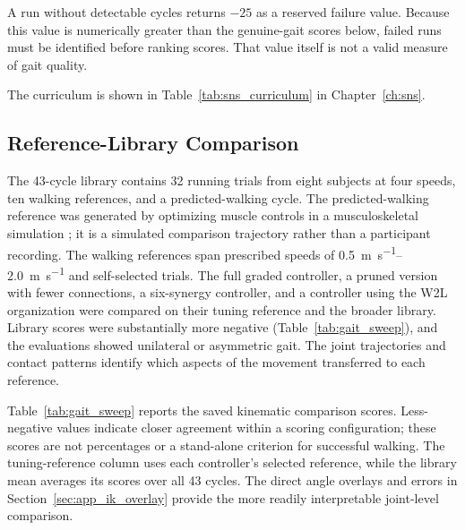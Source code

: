 A run without detectable cycles returns $-25$ as a reserved failure value. Because this value is numerically greater than the genuine-gait scores below, failed runs must be identified before ranking scores. That value itself is not a valid measure of gait quality.

The curriculum is shown in Table~\ref{tab:sns_curriculum} in Chapter~\ref{ch:sns}.

\subsection{Reference-Library Comparison}\label{sec:gait_library_results}

The 43-cycle library contains 32 running trials from eight subjects at four speeds, ten walking references, and a predicted-walking cycle. The predicted-walking reference was generated by optimizing muscle controls in a musculoskeletal simulation \citep{falisse_modeling_2022}; it is a simulated comparison trajectory rather than a participant recording. The walking references span prescribed speeds of \qtyrange{0.5}{2.0}{\meter\per\second} and self-selected trials. The full graded controller, a pruned version with fewer connections, a six-synergy controller, and a controller using the W2L organization were compared on their tuning reference and the broader library. Library scores were substantially more negative (Table~\ref{tab:gait_sweep}), and the evaluations showed unilateral or asymmetric gait. The joint trajectories and contact patterns identify which aspects of the movement transferred to each reference.

Table~\ref{tab:gait_sweep} reports the saved kinematic comparison scores. Less-negative values indicate closer agreement within a scoring configuration; these scores are not percentages or a stand-alone criterion for successful walking. The tuning-reference column uses each controller's selected reference, while the library mean averages its scores over all 43 cycles. The direct angle overlays and errors in Section~\ref{sec:app_ik_overlay} provide the more readily interpretable joint-level comparison.

